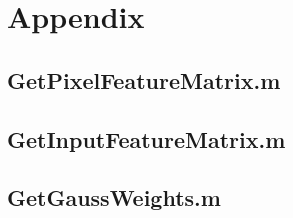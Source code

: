 \newpage
\section{Appendix}\label{Appendix}
\subsection{GetPixelFeatureMatrix.m}\label{GetPixelFeatureMatrix}

\subsection{GetInputFeatureMatrix.m}\label{GetInputFeatureMatrix}


\subsection{GetGaussWeights.m}\label{GetGaussWeights}
